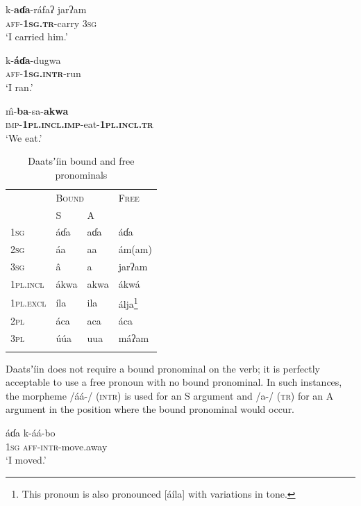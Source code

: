 \documentclass[output=paper]{langsci/langscibook}
\begin{document}
\ea\label{ex:ahlandc:16}
\gll
k-\textbf{aɗa}{}-r\'{a}faʔ   jarʔam \\ 
\textsc{aff-}\textbf{\textsc{1sg.tr}}{}-carry  \textsc{3sg} \\
\glt
‘I carried him.’
\z

\ea\label{ex:ahlandc:17}
\gll
k-\textbf{\'{a}ɗa}{}-dugwa \\
\textsc{aff-\textbf{1sg.intr}}-run   \\
\glt
‘I ran.’
\z

\ea\label{ex:ahlandc:18}
\gll
\^{m}-\textbf{ba}{}-sa-\textbf{akwa} \\
\textsc{imp-}\textbf{\textsc{1pl.incl.imp}}{}-eat-\textbf{\textsc{1pl.incl.tr}} \\
\glt
‘We eat.’
\z


\begin{table}
\begin{tabularx}{\textwidth}{XXXX}
\lsptoprule 
& \multicolumn{2}{X}{\scshape Bound} & \scshape Free\\
& S & A & \\
\midrule
\scshape 1sg & \'{a}ɗa & aɗa & \'{a}ɗa\\
\scshape 2sg & \'{a}a &  aa &  \'{a}m(am)\\
\scshape 3sg &  \^{a} & a &  jarʔam\\
\scshape 1pl.incl &  \'{a}kwa &  akwa &  \'{a}kw\'{a}\\
\scshape 1pl.excl & \'{i}la &  ila &  \'{a}lja\footnote{This pronoun is also pronounced [\'{a}\'{i}la] with variations in tone.} \\
\scshape 2pl & \'{a}ca &  aca & \'{a}ca\\
\scshape 3pl & \'{u}\'{u}a & uua &  m\'{a}ʔam\\
\lspbottomrule
\end{tabularx}
\caption{Daatsʼ\'{i}in bound and free pronominals}
\label{tab:ahlandc:4}
\end{table}

Daatsʼ\'{i}in does not require a bound pronominal on the verb; it is perfectly acceptable to use a free pronoun with no bound pronominal. In such instances, the morpheme /\'{a}\'{a}-/ (\textsc{intr}) is used for an S argument  and /a-/ (\textsc{tr}) for an A argument  in the position where the bound pronominal would occur.  

\ea\label{ex:ahlandc:19}
\gll
\'{a}ɗa   k-\'{a}\'{a}-bo \\
1\textsc{sg}    \textsc{aff-intr-}move.away \\
\glt
‘I moved.’
\z
\end{document}

